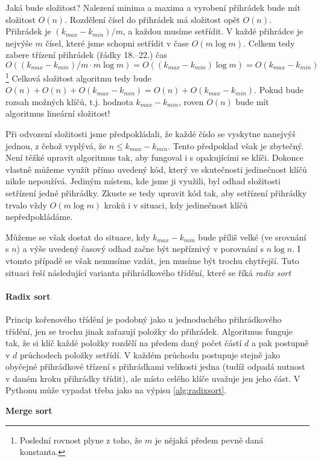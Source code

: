 
Jaká bude složitost? Nalezení minima a maxima a vyrobení přihrádek bude mít složitost $O(n)$. Rozdělení čísel do přihrádek má složitost opět $O(n)$.
Přihrádek je $(k_{max}-k_{min})/m$, a každou musíme setřídit.  V každé přihrádce je
nejvýše $m$ čísel, které jsme schopni setřídit v čase $O(m\log m)$. Celkem tedy
zabere třízení přihrádek (řádky 18.--22.) čas $O((k_{max}-k_{min})/m\cdot m\log m) = O((k_{max}-k_{min})\log m) = O(k_{max}-k_{min})$\footnote{Poslední rovnost plyne z toho, že $m$ je nějaká předem pevně daná konstanta.} Celková složitost algoritmu tedy bude $O(n)+O(n) + O(k_{max}-k_{min}) = O(n) + O(k_{max}-k_{min})$. Pokud bude rozsah
možných klíčů, t.j. hodnota  $k_{max}-k_{min}$, roven $O(n)$ bude mít algoritmus
lineární složitost!

\begin{cviceni}
Při odvození složitosti jsme předpokládali, že každé číslo se vyskytne nanejvýš jednou, z čehož vyplývá, že $n\leq k_{max}-k_{min}$. Tento předpoklad však
je zbytečný. Není těžké upravit algoritmus tak, aby fungoval i s opakujícími se klíči.
Dokonce vlastně můžeme využít přímo uvedený kód, který ve skutečnosti jedinečnost klíčů nikde nepoužívá. Jediným místem, kde jsme ji využili, byl odhad složitosti setřízení jedné přihrádky. Zkuste se tedy
upravit kód tak, aby setřízení přihrádky trvalo vždy $O(m\log m)$ kroků i v situaci,
kdy jedinečnost klíčů nepředpokládáme.
\end{cviceni}

Můžeme se však dostat do situace, kdy $k_{max}-k_{min}$ bude příliš velké (ve srovnání s $n$) a výše uvedený časový odhad začne být nepříznivý v porovnání s $n\log n$.
I vtomto případě se však nemusíme vzdát, jen musíme být trochu chytřejší. Tuto situaci
řeší následující varianta přihrádkového třídění, které se říká \emph{radix sort}

\paragraph{Radix sort} Princip kořenového třídění je podobný jako u jednoduchého
přihrádkového třídění, jen se trochu jinak zařazují položky do přihrádek. Algoritmus funguje tak, že si klíč každé položky rozdělí na předem daný počet částí $d$ a pak
postupně v $d$ průchodech položky setřídí. V každém průchodu postupuje stejně jako
obyčejné přihrádkové třízení s přihrádkami velikosti jedna (tudíž odpadá
nutnost v daném kroku přihrádky třídit), ale místo celého klíče uvažuje jen jeho část. V Pythonu může vypadat třeba jako na výpisu \ref{alg:radixsort}.


\begin{todo}
{\bf Merge sort}

\end{todo}

\ifx\ucebnice\undefined

\fi
